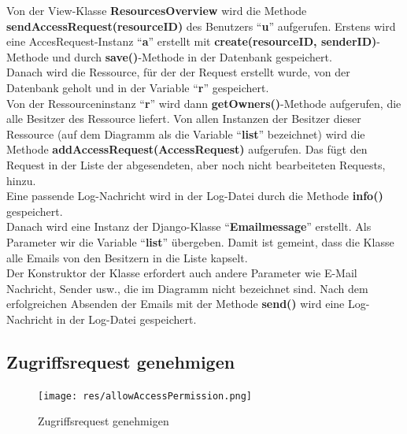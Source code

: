 \documentclass[parskip=full,11pt]{scrartcl}
\begin{document}
Von der View-Klasse \textbf{ResourcesOverview} wird die Methode \textbf{sendAccessRequest(resourceID)} des Benutzers \enquote{\textbf{u}}  aufgerufen. Erstens wird eine AccesRequest-Instanz \enquote{\textbf{a}} erstellt mit \textbf{create(resourceID, senderID)}-Methode und durch \textbf{save()}-Methode in der Datenbank gespeichert. \\Danach wird die Ressource, für der der Request erstellt wurde, von der Datenbank geholt und in der Variable \enquote{\textbf{r}} gespeichert.\\Von der Ressourceninstanz \enquote{\textbf{r}} wird dann \textbf{getOwners()}-Methode aufgerufen, die alle Besitzer des Ressource liefert. Von allen Instanzen der Besitzer dieser Ressource (auf dem Diagramm als die Variable \enquote{\textbf{list}} bezeichnet) wird die Methode \textbf{addAccessRequest(AccessRequest)} aufgerufen. Das fügt den Request in der Liste der abgesendeten, aber noch nicht bearbeiteten Requests, hinzu.\\Eine passende Log-Nachricht wird in der Log-Datei durch die Methode \textbf{info()} gespeichert.\\Danach wird eine Instanz der Django-Klasse \enquote{\textbf{Emailmessage}} erstellt. Als Parameter wir die Variable \enquote{\textbf{list}} übergeben. Damit ist gemeint, dass die Klasse alle Emails von den Besitzern in die Liste kapselt.\\Der Konstruktor der Klasse erfordert auch andere Parameter wie E-Mail Nachricht, Sender usw., die im Diagramm nicht bezeichnet sind. Nach dem erfolgreichen Absenden der Emails mit der Methode \textbf{send()} wird eine Log-Nachricht in der Log-Datei gespeichert. 
 
  \newpage
 \subsection{Zugriffsrequest genehmigen}
 \begin{figure}[ht!]
 	\centering
 	\texttt{[image: res/allowAccessPermission.png]}
 	\caption{Zugriffsrequest genehmigen}
 	 	\label{fig:allowAccPerm}
 \end{figure}
 
\end{document}
